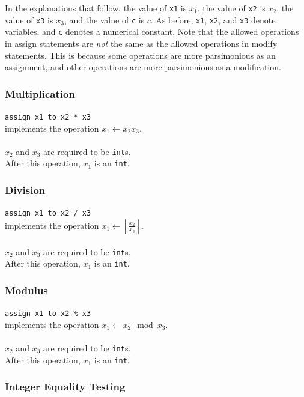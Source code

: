 In the explanations that follow, the value of \texttt{x1} is $x_1$, the value of \texttt{x2} is $x_2$, the value of \texttt{x3} is $x_3$, and the value of \texttt{c} is $c$. As before, \texttt{x1}, \texttt{x2}, and \texttt{x3} denote variables, and \texttt{c} denotes a numerical constant. Note that the allowed operations in assign statements are \emph{not} the same as the allowed operations in modify statements. This is because some operations are more parsimonious as an assignment, and other operations are more parsimonious as a modification.

\subsubsection{Multiplication}

\texttt{assign x1 to x2 * x3} \\
implements the operation $x_1 \leftarrow x_2 x_3$. \\ \\
$x_2$ and $x_3$ are required to be \texttt{int}s. \\
After this operation, $x_1$ is an \texttt{int}.

\subsubsection{Division} 

\texttt{assign x1 to x2 / x3} \\
implements the operation $x_1 \leftarrow \left \lfloor{\frac{x_2}{x_3}}\right \rfloor$. \\ \\
$x_2$ and $x_3$ are required to be \texttt{int}s. \\
After this operation, $x_1$ is an \texttt{int}.

\subsubsection{Modulus} 

\texttt{assign x1 to x2 \% x3} \\
implements the operation $x_1 \leftarrow x_2\mod x_3$. \\ \\
$x_2$ and $x_3$ are required to be \texttt{int}s. \\
After this operation, $x_1$ is an \texttt{int}.

\subsubsection{Integer Equality Testing}

